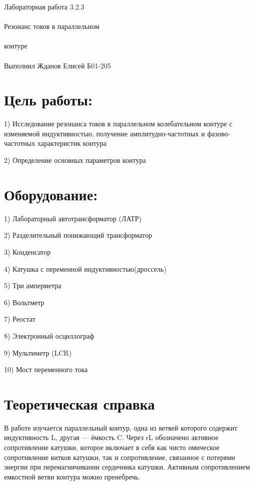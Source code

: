 \documentclass{astroedu-lab}
\begin{document}
\pagestyle{plain}

\begin{problem}{\huge Лабораторная работа 3.2.3\\\\Резонанс токов в параллельном\\\\контуре\\\\Выполнил Жданов Елисей Б01-205}

\section{Цель работы:}

1) Исследование резонанса токов в параллельном колебательном
контуре с изменяемой индуктивностью, получение амплитудно-частотных и фазово-частотных характеристик контура

2) Определение основных параметров контура


\section{Оборудование:}

1) Лабораторный автотрансформатор (ЛАТР)

2) Разделительный понижающий трансформатор

3) Конденсатор

4) Катушка с переменной индуктивностью(дроссель)

5) Три амперметра

6) Вольтметр

7) Реостат

8) Электронный осциллограф

9) Мультиметр (LCR)

10) Мост переменного тока

\newpage

\section{Теоретическая справка}

В работе изучается параллельный контур, одна из ветвей которого содержит индуктивность L, другая — ёмкость C. Через rL обозначено активное сопротивление катушки, которое включает в себя как чисто омическое сопротивление витков катушки, так и сопротивление, связанное с потерями энергии при перемагничивании сердечника катушки. Активным сопротивлением емкостной ветви контура можно пренебречь.


\end{problem}
\end{document}
